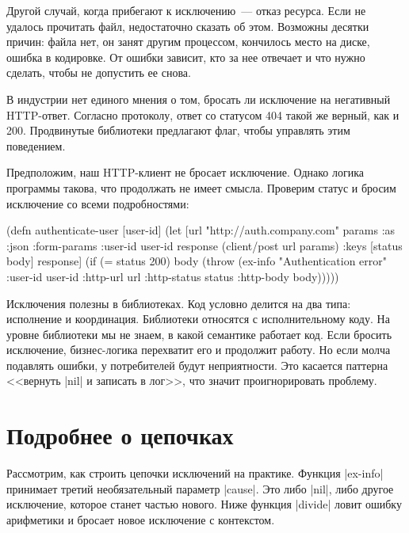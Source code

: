 Другой случай, когда прибегают к исключению~--- отказ ресурса. Если не удалось
прочитать файл, недостаточно сказать об этом. Возможны десятки причин: файла
нет, он занят другим процессом, кончилось место на диске, ошибка в кодировке. От
ошибки зависит, кто за нее отвечает и что нужно сделать, чтобы не допустить ее
снова.

В индустрии нет единого мнения о том, бросать ли исключение на негативный
HTTP-ответ. Согласно протоколу, ответ со статусом 404 такой же верный, как и
200. Продвинутые библиотеки предлагают флаг, чтобы управлять этим поведением.

Предположим, наш HTTP-клиент не бросает исключение. Однако логика программы
такова, что продолжать не имеет смысла. Проверим статус и бросим исключение со
всеми подробностями:

\begin{english}
  \begin{clojure}
(defn authenticate-user [user-id]
  (let [url "http://auth.company.com"
        params {:as :json :form-params {:user-id user-id}}
        response (client/post url params)
        {:keys [status body]} response]
    (if (= status 200)
      body
      (throw (ex-info "Authentication error"
                      {:user-id user-id
                       :http-url url
                       :http-status status
                       :http-body body})))))
  \end{clojure}
\end{english}

Исключения полезны в библиотеках. Код условно делится на два типа: исполнение и
координация. Библиотеки относятся с исполнительному коду. На уровне библиотеки
мы не знаем, в какой семантике работает код. Если бросить исключение,
бизнес-логика перехватит его и продолжит работу. Но если молча подавлять ошибки,
у потребителей будут неприятности. Это касается паттерна <<вернуть \spverb|nil|
и записать в лог>>, что значит проигнорировать проблему.

\section{Подробнее о цепочках}

Рассмотрим, как строить цепочки исключений на практике. Функция \spverb|ex-info|
принимает третий необязательный параметр \spverb|cause|. Это либо \spverb|nil|,
либо другое исключение, которое станет частью нового. Ниже функция
\spverb|divide| ловит ошибку арифметики и бросает новое исключение с контекстом.

